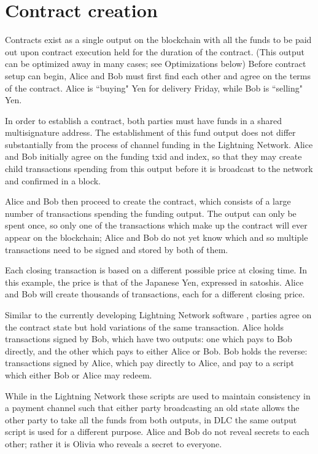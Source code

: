 \documentclass[11pt]{article}
\begin{document}
\section*{Contract creation}


Contracts exist as a single output on the blockchain with all the funds to be paid out upon contract execution held for the duration of the contract.  (This output can be optimized away in many cases; see Optimizations below)  Before contract setup can begin, Alice and Bob must first find each other and agree on the terms of the contract.  Alice is ``buying" Yen for delivery Friday, while Bob is ``selling" Yen.

In order to establish a contract, both parties must have funds in a shared multisignature address.  The establishment of this fund output does not differ substantially from the process of channel funding in the Lightning Network.  Alice and Bob initially agree on the funding txid and index, so that they may create child transactions spending from this output before it is broadcast to the network and confirmed in a block.

Alice and Bob then proceed to create the contract, which consists of a large number of transactions spending the funding output.  The output can only be spent once, so only one of the transactions which make up the contract will ever appear on the blockchain; Alice and Bob do not yet know which and so multiple transactions need to be signed and stored by both of them.

Each closing transaction is based on a different possible price at closing time.  In this example, the price is that of the Japanese Yen, expressed in satoshis.  Alice and Bob will create thousands of transactions, each for a different closing price.  

Similar to the currently developing Lightning Network software \cite{lnpaper}, parties agree on the contract state but hold variations of the same transaction.  Alice holds transactions signed by Bob, which have two outputs: one which pays to Bob directly, and the other which pays to either Alice or Bob.  Bob holds the reverse: transactions signed by Alice, which pay directly to Alice, and pay to a script which either Bob or Alice may redeem.

While in the Lightning Network these scripts are used to maintain consistency in a payment channel such that either party broadcasting an old state allows the other party to take all the funds from both outputs, in DLC the same output script is used for a different purpose.  Alice and Bob do not reveal secrets to each other; rather it is Olivia who reveals a secret to everyone.
\end{document}
